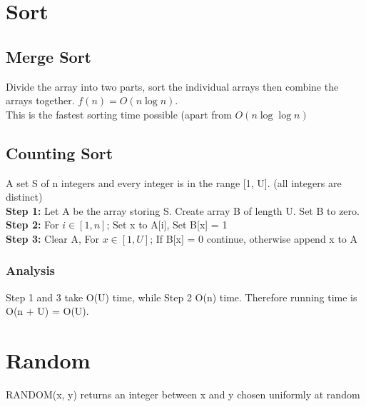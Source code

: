 \documentclass[5pt,a4paper]{article}
\begin{document}
\begin{multicols}{3}
\section{Sort}
\subsection{Merge Sort}
Divide the array into two parts, sort the individual arrays then combine the arrays together.
$f(n)=O(n\log n)$.\\
This is the fastest sorting time possible (apart from $O(n\log\log n)$
\subsection{Counting Sort}
A set S of n integers and every integer is in the range [1, U]. (all integers are distinct)\\
\textbf{Step 1:} Let A be the array storing S. Create array B of length U. Set B to zero.\\
\textbf{Step 2:} For $i\in [1,n]$; Set x to A[i], Set B[x] = 1\\
\textbf{Step 3:} Clear A, For $x\in[1,U]$; If B[x] = 0 continue, otherwise append x to A
\subsubsection{Analysis}
Step 1 and 3 take O(U) time, while Step 2 O(n) time. Therefore running time is O(n + U) = O(U).

\section{Random}
RANDOM(x, y) returns an integer between x and y chosen uniformly at random


\end{multicols}
\end{document}

